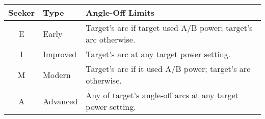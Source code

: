 
\begin{onecolumntablefloat}
\begin{onecolumntable}
\begin{tabularx}{\linewidth}{clP}
\toprule
Seeker  &Type       &Angle-Off Limits\\
\midrule
E       &Early      &Target's  arc if target used A/B power; target's  arc otherwise.\\
I       &Improved   &Target's  arc at any target power setting.\\
M       &Modern	    &Target's  arc if it used A/B power; target's  arc otherwise.\\
A       &Advanced   &Any of target's angle-off arcs at any target power setting.\\
\bottomrule
\end{tabularx}
\end{onecolumntable}
\end{onecolumntablefloat}
